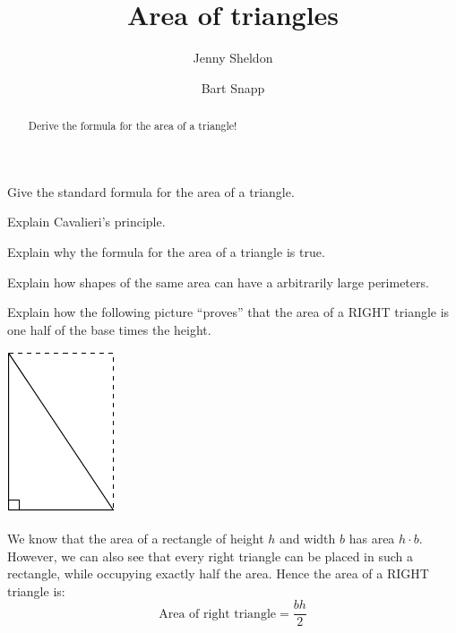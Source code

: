 \documentclass[handout,nooutcomes,noauthor]{ximera}
\title{Area of triangles}
\author{Jenny Sheldon \and Bart Snapp}
\begin{document}
\begin{abstract}
  Derive the formula for the area of a triangle!
\end{abstract}
\maketitle


\begin{listOutcomes}
\item Give the standard formula for the area of a triangle.
\item Explain Cavalieri's principle.
\item Explain why the formula for the area of a triangle is true.
\item Explain how shapes of the same area can have a arbitrarily large
  perimeters.
\end{listOutcomes}


\mynewpage



\begin{question} 
  Explain how the following picture ``proves'' that the area of a RIGHT
  triangle is one half of the base times the height.
  \begin{center}
  \includegraphics{pbpAreaRight.pdf}
  \end{center}
  \begin{freeResponse}
    We know that the area of a rectangle of height $h$ and width $b$
    has area $h\cdot b$. However, we can also see that every right
    triangle can be placed in such a rectangle, while occupying
    exactly half the area. Hence the area of a RIGHT triangle is:
    \[
    \text{Area of right triangle} = \frac{bh}{2}
    \]
  \end{freeResponse}
\end{question}
\mynewpage
\end{document}
